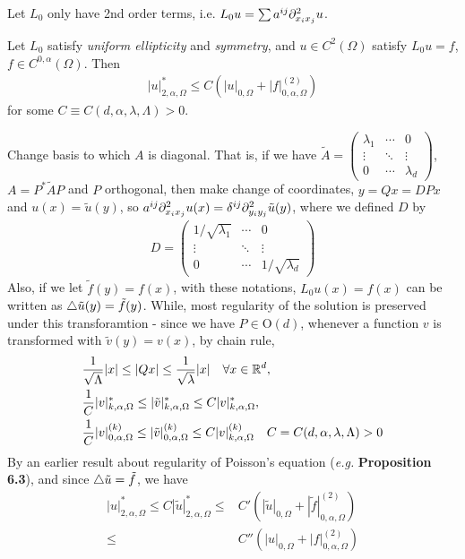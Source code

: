 \documentclass[12pt,a4paper]{article}
\newenvironment{proof}
{\begin{changemargin}{1cm}{0.5cm} 
	}%
	{\end{changemargin}
}
\newenvironment{p}
{\begin{proof} 
	}%
	{\end{proof}
}
\begin{document}
Let $L_0$ only have 2nd order terms, i.e. $L_0 u = \sum a^{ij} \partial^2_{x_i x_j} u$.
\s

 Let $L_0$ satisfy \emph{uniform ellipticity} and \emph{symmetry}, and $u\in C^2(\Omega)$ satisfy $L_0 u=f$, $f\in C^{0, \alpha}(\Omega)$. Then
\begin{align*}
|u|^*_{2, \alpha, \Omega} \leq C(|u|_{0, \Omega} + |f|^{(2)}_{0, \alpha, \Omega})
\end{align*}
for some $C \equiv C(d,\alpha, \lambda, \Lambda) >0$.
\begin{p}
\pf Change basis to which $A$ is diagonal. That is, if we have $\tilde{A} = \begin{pmatrix}
\lambda_1 & \cdots & 0 \\
\vdots & \ddots & \vdots \\
0 & \cdots &\lambda_d
\end{pmatrix}$, $A = P^* \tilde{A}P$ and $P$ orthogonal, then make change of coordinates, $y = Qx = DPx$ and $u(x) = \tilde{u}(y)$, so $a^{ij}\partial^2_{x_i x_j}u(x) = \delta^{ij} \partial^2_{y_i y_j} \tilde{u}(y)$, where we defined $D$ by
\begin{align*}
D = \begin{pmatrix}
1/\sqrt{\lambda_1} & \cdots & 0 \\
\vdots & \ddots & \vdots \\
0 &\cdots & 1/\sqrt{\lambda_d}
\end{pmatrix}
\end{align*}
Also, if we let $\tilde{f}(y) = f(x)$, with these notations, $L_0 u(x) = f(x)$ can be written as $\triangle \tilde{u}(y) = \tilde{f}(y)$. While, most regularity of the solution is preserved under this transforamtion - since we have $P \in \text{O}(d)$, whenever a function $v$ is transformed with $\tilde{v}(y) =v(x)$, by chain rule,
\begin{align*}
&\frac{1}{\sqrt{\Lambda}}|x| \leq |Qx| \leq \frac{1}{\sqrt{\lambda}}|x| \quad \forall x\in \mathbb{R}^d ,\\
&\frac{1}{C}|v|_{k, \alpha, \Omega}^* \leq |\tilde{v}|^*_{k, \alpha, \Omega}\leq C|v|^*_{k, \alpha, \Omega}, \\
&\frac{1}{C} |v|^{(k)}_{0, \alpha, \Omega} \leq |\tilde{v}|^{(k)}_{0, \alpha, \Omega} \leq C |v|^{(k)}_{k, \alpha, \Omega} \quad C= C(d,\alpha,\lambda, \Lambda) >0
\end{align*}
By an earlier result about regularity of Poisson's equation (\textit{e.g.} \textbf{Proposition 6.3}), and since $\triangle \tilde{u} = \tilde{f}$, we have
\begin{align*}
|u|^*_{2, \alpha, \Omega} \leq C|\tilde{u}|^*_{2, \alpha, \Omega} \leq & C' (|\tilde{u}|_{0, \Omega}+ |\tilde{f}|^{(2)}_{0, \alpha, \Omega}) \\
\leq & C''(|u|_{0, \Omega} + |f|^{(2)}_{0, \alpha, \Omega})
\end{align*}

\eop
\end{p}
\s
\end{document}
